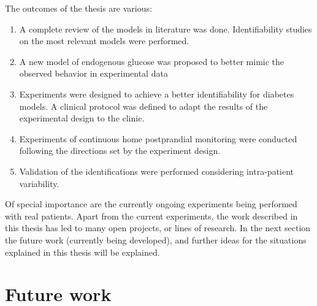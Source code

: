 The outcomes of the thesis are various:
\begin{enumerate}
	\item A complete review of the models in literature was done. Identifiability studies on the most relevant models were performed.
	\item A new model of endogenous glucose was proposed to better mimic the observed behavior in experimental data
	\item Experiments were designed to achieve a better identifiability for diabetes models. A clinical protocol was defined to adapt the results of the experimental design to the clinic.
	\item Experiments of continuous home postprandial monitoring were conducted following the directions set by the experiment design.
	\item Validation of the identifications were performed considering intra-patient variability.
\end{enumerate}

Of special importance are the currently ongoing experiments being performed with real patients. Apart from the current experiments, the work described in this thesis has led to many open projects, or lines of research. In the next section the future work (currently being developed), and further ideas for the situations explained in this thesis will be explained.

\section{Future work}
\label{sec:FutureWork}

